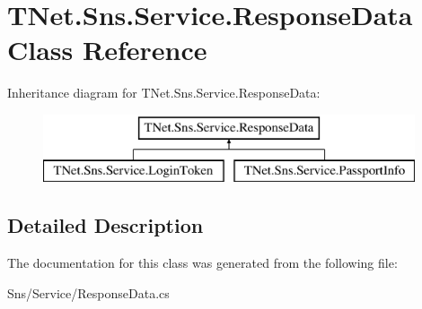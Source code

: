 \hypertarget{class_t_net_1_1_sns_1_1_service_1_1_response_data}{}\section{T\+Net.\+Sns.\+Service.\+Response\+Data Class Reference}
\label{class_t_net_1_1_sns_1_1_service_1_1_response_data}


 


Inheritance diagram for T\+Net.\+Sns.\+Service.\+Response\+Data\+:\begin{figure}[H]
\begin{center}
\leavevmode
\includegraphics[height=2.000000cm]{class_t_net_1_1_sns_1_1_service_1_1_response_data}
\end{center}
\end{figure}


\subsection{Detailed Description}




The documentation for this class was generated from the following file\+:\begin{DoxyCompactItemize}
\item 
Sns/\+Service/Response\+Data.\+cs\end{DoxyCompactItemize}
